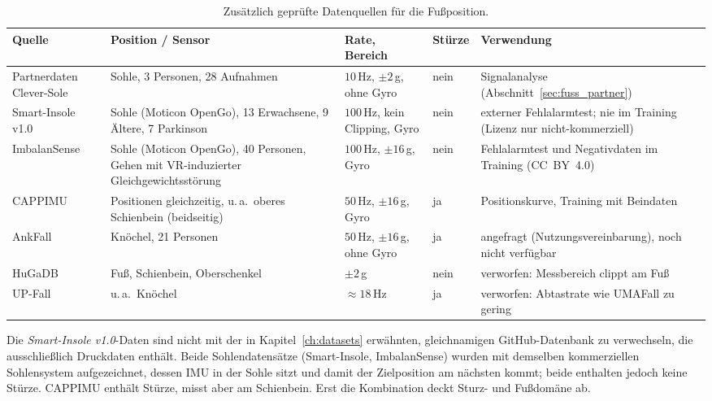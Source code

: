 \documentclass[11pt,a4paper,oneside]{report}
\begin{document}
\begin{table}[H]
\centering
\caption{Zusätzlich geprüfte Datenquellen für die Fußposition.}
\label{tab:fuss_daten}
\footnotesize
\setlength{\tabcolsep}{3pt}
\renewcommand{\arraystretch}{1.15}
\begin{tabularx}{\textwidth}{
>{\raggedright\arraybackslash}p{2.0cm}
>{\raggedright\arraybackslash}p{2.6cm}
>{\raggedright\arraybackslash}p{2.2cm}
>{\centering\arraybackslash}p{1.1cm}
>{\raggedright\arraybackslash}X
}
\toprule
\textbf{Quelle} & \textbf{Position / Sensor} & \textbf{Rate, Bereich}
& \textbf{Stürze} & \textbf{Verwendung} \\
\midrule
Partnerdaten Clever-Sole
& Sohle, 3 Personen, 28 Aufnahmen
& $10$\,Hz, $\pm 2$\,g, ohne Gyro
& nein
& Signalanalyse (Abschnitt~\ref{sec:fuss_partner}) \\

Smart-Insole v1.0 \cite{smartinsole2021}
& Sohle (Moticon OpenGo), 13 Erwachsene, 9 Ältere, 7 Parkinson
& $100$\,Hz, kein Clipping, Gyro
& nein
& externer Fehlalarmtest; nie im Training (Lizenz nur nicht-kommerziell) \\

ImbalanSense \cite{imbalansense2026}
& Sohle (Moticon OpenGo), 40 Personen, Gehen mit VR-induzierter
  Gleichgewichtsstörung
& $100$\,Hz, $\pm 16$\,g, Gyro
& nein
& Fehlalarmtest und Negativdaten im Training (CC~BY~4.0) \\

CAPPIMU \cite{cappimu2024}
& 9 Positionen gleichzeitig, u.\,a.\ oberes Schienbein (beidseitig)
& $50$\,Hz, $\pm 16$\,g, Gyro
& ja
& Positionskurve, Training mit Beindaten \\

\midrule
AnkFall \cite{ankfall2021}
& Knöchel, 21 Personen
& $50$\,Hz, $\pm 16$\,g, ohne Gyro
& ja
& angefragt (Nutzungsvereinbarung), noch nicht verfügbar \\

HuGaDB \cite{hugadb2017}
& Fuß, Schienbein, Oberschenkel
& $\pm 2$\,g
& nein
& verworfen: Messbereich clippt am Fuß \\

UP-Fall \cite{upfall2019}
& u.\,a.\ Knöchel
& $\approx 18$\,Hz
& ja
& verworfen: Abtastrate wie UMAFall zu gering \\
\bottomrule
\end{tabularx}
\end{table}

Die \emph{Smart-Insole v1.0}-Daten sind nicht mit der in
Kapitel~\ref{ch:datasets} erwähnten, gleichnamigen GitHub-Datenbank zu
verwechseln, die ausschließlich Druckdaten enthält. Beide
Sohlendatensätze (Smart-Insole, ImbalanSense) wurden mit demselben
kommerziellen Sohlensystem aufgezeichnet, dessen \ac{IMU} in der Sohle
sitzt und damit der Zielposition am nächsten kommt; beide enthalten
jedoch keine Stürze. CAPPIMU enthält Stürze, misst aber am Schienbein.
Erst die Kombination deckt Sturz- und Fußdomäne ab.
\end{document}
